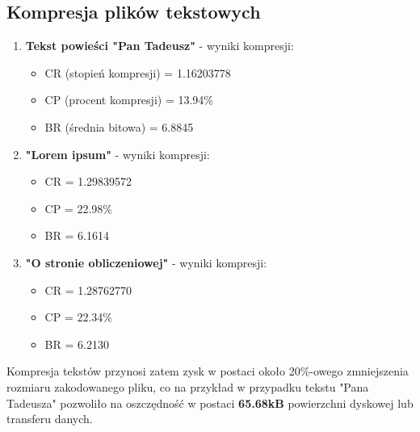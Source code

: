 \documentclass{article}
\begin{document}
\subsection{Kompresja plików tekstowych}
\begin{enumerate}
\item \textbf{Tekst powieści "Pan Tadeusz"} - wyniki kompresji:
    \begin{itemize}
        \item CR (stopień kompresji) = 1.16203778
        \item CP (procent kompresji) = 13.94\%
        \item BR (średnia bitowa) = 6.8845
    \end{itemize}
\item \textbf{"Lorem ipsum"} - wyniki kompresji:
    \begin{itemize}
        \item CR = 1.29839572
        \item CP = 22.98\%
        \item BR = 6.1614
    \end{itemize}
\item \textbf{"O stronie obliczeniowej"} - wyniki kompresji:
    \begin{itemize}
        \item CR = 1.28762770
        \item CP = 22.34\%
        \item BR = 6.2130
    \end{itemize}
\end{enumerate}

Kompresja tekstów przynosi zatem zysk w postaci około 20\%-owego zmniejszenia rozmiaru zakodowanego pliku, co na przykład w przypadku tekstu "Pana Tadeusza" pozwoliło na oszczędność w postaci \textbf{65.68kB} powierzchni dyskowej lub transferu danych.
\end{document}
